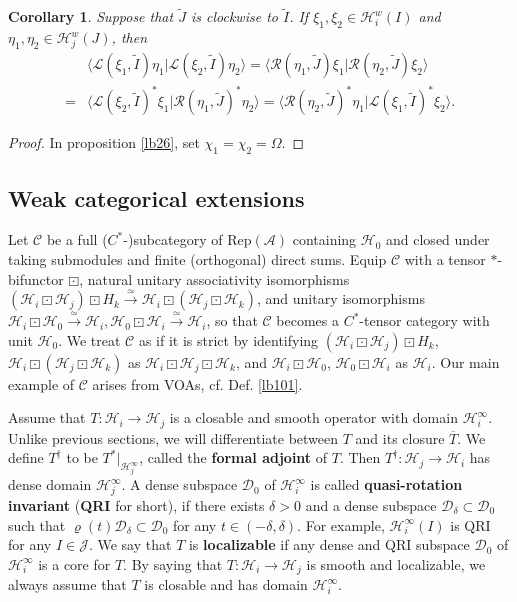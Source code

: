 \documentclass[11pt,b5paper,notitlepage]{article}
\theoremstyle{definition}
\theoremstyle{plain}
\newtheorem{co}[df]{Corollary}
\newcommand{\mc}{\mathcal}
\newcommand{\wtd}{\widetilde}
\newcommand{\ovl}{\overline}
\newcommand{\Rep}{\mathrm{Rep}}
\newcommand{\Dom}{\scr D}
\newcommand{\bk}[1]{\langle {#1}\rangle}
\newcommand{\scr}{\mathscr}
\numberwithin{equation}{subsection}
\begin{document}
\begin{co}\label{lb5}
	Suppose that $\wtd J$ is clockwise to $\wtd I$. If $\xi_1,\xi_2\in\mc H_i^w(I)$ and $\eta_1,\eta_2\in\mc H_j^w(J)$, then 
	\begin{align}
	&\bk{\scr L(\xi_1,\wtd I)\eta_1|\scr L(\xi_2,\wtd I)\eta_2 }=\bk{\scr R(\eta_1,\wtd J)\xi_1|\scr R(\eta_2,\wtd J)\xi_2}\nonumber\\
	=&\bk{\scr L(\xi_2,\wtd I)^*\xi_1|\scr R(\eta_1,\wtd J)^*\eta_2}=\bk{\scr R(\eta_2,\wtd J)^*\eta_1|\scr L(\xi_1,\wtd I)^*\xi_2}.\label{eq6}
	\end{align}
\end{co}

\begin{proof}
In proposition \ref{lb26}, set $\chi_1=\chi_2=\Omega$.
\end{proof}






\subsection{Weak categorical extensions}\label{lb33}

Let $\scr C$ be a full ($C^*$-)subcategory of $\Rep(\mc A)$ containing $\mc H_0$ and closed under taking submodules and finite (orthogonal) direct sums. %
Equip $\scr C$  with a tensor $*$-bifunctor $\boxdot$, natural unitary associativity isomorphisms $(\mc H_i\boxdot\mc H_j)\boxdot H_k\xrightarrow\simeq\mc H_i\boxdot(\mc H_j\boxdot\mc H_k)$, and unitary isomorphisms $\mc H_i\boxdot\mc H_0\xrightarrow\simeq\mc H_i,\mc H_0\boxdot\mc H_i\xrightarrow\simeq \mc H_i$, so that $\scr C$ becomes a $C^*$-tensor category with unit $\mc H_0$. We treat $\scr C$ as if it is strict by identifying $(\mc H_i\boxdot\mc H_j)\boxdot H_k$, $\mc H_i\boxdot(\mc H_j\boxdot\mc H_k)$ as $\mc H_i\boxdot\mc H_j\boxdot \mc H_k$, and $\mc H_i\boxdot \mc H_0$, $\mc H_0\boxdot\mc H_i$ as $\mc H_i$. Our main example of $\scr C$ arises from VOAs, cf. Def. \ref{lb101}.



Assume that $T:\mc H_i\rightarrow\mc H_j$ is a closable and smooth operator with domain $\mc H_i^\infty$. Unlike previous sections, we will differentiate between $T$  and its closure $\ovl T$. We define $T^\dagger$ to be $T^*|_{\mc H_j^\infty}$,  called the \textbf{formal adjoint} of $T$. Then $T^\dagger:\mc H_j\rightarrow\mc H_i$ has  dense domain $\mc H_j^\infty$. A dense subspace $\Dom_0$ of $\mc H_i^\infty$ is called \textbf{quasi-rotation invariant} (\textbf{QRI} for short), if there exists $\delta>0$ and a dense subspace $\Dom_\delta\subset\Dom_0$ such that $\varrho(t)\Dom_\delta\subset\Dom_0$ for any $t\in(-\delta,\delta)$. For example, $\mc H_i^\infty(I)$ is QRI for any $I\in\mc J$. We say that $T$ is \textbf{localizable} if any dense and QRI subspace $\Dom_0$ of $\mc H_i^\infty$ is a core for $T$. By saying that $T:\mc H_i\rightarrow\mc H_j$ is smooth and localizable, we always assume that $T$ is closable and has domain $\mc H_i^\infty$.
\end{document}
